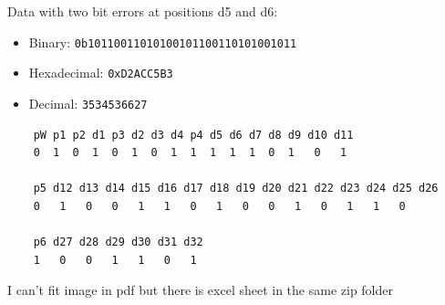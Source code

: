 \documentclass[a4paper,11pt]{article}%
\newenvironment{qanda}{\setlength{\parindent}{0pt}}{\bigskip}
\begin{document}
\begin{qanda}
	Data with two bit errors at positions d5 and d6:
	\begin{itemize}
	\item Binary: \texttt{0b10110011010100101100110101001011}
	\item Hexadecimal: \texttt{0xD2ACC5B3}
	\item Decimal: \texttt{3534536627}
	\end{itemize}
	

\begin{verbatim}
	pW p1 p2 d1 p3 d2 d3 d4 p4 d5 d6 d7 d8 d9 d10 d11
	0  1  0  1  0  1  0  1  1  1  1  1  0  1   0   1

	p5 d12 d13 d14 d15 d16 d17 d18 d19 d20 d21 d22 d23 d24 d25 d26
	0   1   0   0   1   1   0   1   0   0   1   0   1   1   0

	p6 d27 d28 d29 d30 d31 d32
	1   0   0   1   1   0   1
\end{verbatim}
I can't fit image in pdf but there is excel sheet in the same zip folder
\begin{figure}[H]
	\centering

\end{figure}
\end{qanda}
\end{document}

